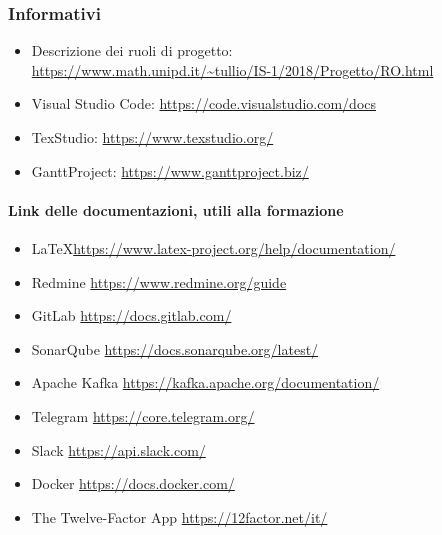     \subsubsection{Informativi}	\label{rifinfo}
    \begin{itemize}
        \item Descrizione dei ruoli di progetto: \\\url{https://www.math.unipd.it/~tullio/IS-1/2018/Progetto/RO.html}
        \item Visual Studio Code: \url{https://code.visualstudio.com/docs}
        \item TexStudio: \url{https://www.texstudio.org/}
        \item GanttProject: \url{https://www.ganttproject.biz/}
	\end{itemize}

	\paragraph*{Link delle documentazioni, utili alla formazione}
	\begin{itemize}
		\item \LaTeX \url{https://www.latex-project.org/help/documentation/}
		\item Redmine \url{https://www.redmine.org/guide}
		\item GitLab \url{https://docs.gitlab.com/}
		\item SonarQube \url{https://docs.sonarqube.org/latest/}
		\item Apache Kafka \url{https://kafka.apache.org/documentation/}
		\item Telegram \url{https://core.telegram.org/}
		\item Slack \url{https://api.slack.com/}
		\item Docker \url{https://docs.docker.com/}
		\item The Twelve-Factor App \url{https://12factor.net/it/}
	\end{itemize}
